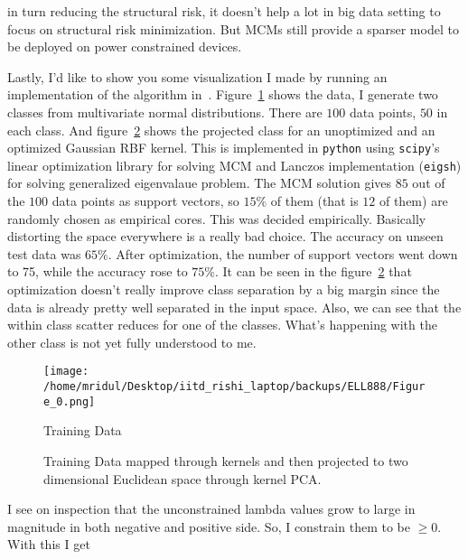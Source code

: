 \documentclass[11pt]{article}
\begin{document}
in turn reducing the structural risk, it doesn't help a lot in big data setting
to focus on structural risk minimization. But MCMs still provide a sparser model
to be deployed on power constrained devices.\par
Lastly, I'd like to show you some visualization I made by running an
implementation of the algorithm in~\cite{keropt}. Figure~\ref{fig:data} shows the data,
I generate two classes from multivariate normal distributions. There are $100$
data points, $50$ in each class. And figure~\ref{fig:kernelPCA} shows the projected class for
an unoptimized and an optimized Gaussian RBF kernel. This is implemented in
\texttt{python} using \texttt{scipy}'s linear optimization library for solving
MCM and Lanczos implementation (\texttt{eigsh}) for solving generalized
eigenvalaue problem. The MCM solution gives $85$ out of the $100$ data points as
support vectors, so $15\%$ of them (that is $12$ of them) are randomly chosen as
empirical cores. This was decided empirically. Basically distorting the space
everywhere is a really bad choice. The accuracy on unseen test data was $65\%$.
After optimization, the number of support vectors went down to 75, while the
accuracy rose to $75\%$. It can be seen in the figure~\ref{fig:kernelPCA} that
optimization doesn't really improve class separation by a big margin since the
data is already pretty well separated in the input space. Also, we can see that
the within class scatter reduces for one of the classes. What's happening with
the other class is not yet fully understood to me.
\begin{figure}[!htbp]
    \centering
    \texttt{[image: /home/mridul/Desktop/iitd\_rishi\_laptop/backups/ELL888/Figure\_0.png]}
    \caption{\label{fig:data}Training Data}
\end{figure}
\begin{figure}[!htbp]
    \centering
    \caption{\label{fig:kernelPCA}Training Data mapped through kernels and then projected
    to two dimensional Euclidean space through kernel PCA.}
\end{figure}\par
\afterpage{\clearpage}
I see on inspection that the unconstrained lambda values grow to large in magnitude
in both negative and positive side. So, I constrain them to be $\ge 0$. With this I get
\end{document}
